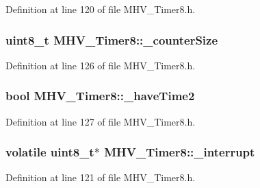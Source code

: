 \-Definition at line 120 of file \-M\-H\-V\-\_\-\-Timer8.\-h.

\hypertarget{class_m_h_v___timer8_a25827d35452ab31f1f0e1beb232a259b}{
\subsubsection[{\-\_\-counter\-Size}]{\setlength{\rightskip}{0pt plus 5cm}uint8\-\_\-t {\bf \-M\-H\-V\-\_\-\-Timer8\-::\-\_\-counter\-Size}}}
\label{class_m_h_v___timer8_a25827d35452ab31f1f0e1beb232a259b}


\-Definition at line 126 of file \-M\-H\-V\-\_\-\-Timer8.\-h.

\hypertarget{class_m_h_v___timer8_adffeb4bbdd699814b5d0abd9cf59b3a9}{
\subsubsection[{\-\_\-have\-Time2}]{\setlength{\rightskip}{0pt plus 5cm}bool {\bf \-M\-H\-V\-\_\-\-Timer8\-::\-\_\-have\-Time2}}}
\label{class_m_h_v___timer8_adffeb4bbdd699814b5d0abd9cf59b3a9}


\-Definition at line 127 of file \-M\-H\-V\-\_\-\-Timer8.\-h.

\hypertarget{class_m_h_v___timer8_a98e41d7d3ceef4b8fce11644ea110ee9}{
\subsubsection[{\-\_\-interrupt}]{\setlength{\rightskip}{0pt plus 5cm}volatile uint8\-\_\-t$\ast$ {\bf \-M\-H\-V\-\_\-\-Timer8\-::\-\_\-interrupt}}}
\label{class_m_h_v___timer8_a98e41d7d3ceef4b8fce11644ea110ee9}


\-Definition at line 121 of file \-M\-H\-V\-\_\-\-Timer8.\-h.

